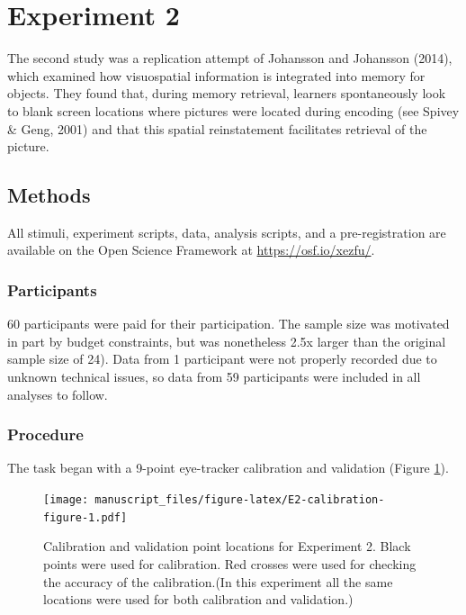 \documentclass[
  man,floatsintext]{apa6}
\begin{document}
\hypertarget{experiment-2}{%
\section{Experiment 2}\label{experiment-2}}

The second study was a replication attempt of Johansson and Johansson (2014),
which examined how visuospatial information is integrated into memory
for objects. They found that, during memory retrieval, learners
spontaneously look to blank screen locations where pictures were located
during encoding (see Spivey \& Geng, 2001) and that
this spatial reinstatement facilitates retrieval of the picture.

\hypertarget{methods-1}{%
\subsection{Methods}\label{methods-1}}

All stimuli, experiment scripts, data, analysis scripts, and a
pre-registration are available on the Open Science Framework at
\url{https://osf.io/xezfu/}.

\hypertarget{participants-2}{%
\subsubsection{Participants}\label{participants-2}}

60 participants were paid for their participation.
The sample size was motivated in part by budget constraints, but was
nonetheless 2.5x larger than the original sample size of 24).
Data from 1 participant were not properly
recorded due to unknown technical issues, so data from 59 participants
were included in all analyses to follow.

\hypertarget{procedure-1}{%
\subsubsection{Procedure}\label{procedure-1}}

The task began with a 9-point eye-tracker calibration
and validation (Figure \ref{fig:E2-calibration-figure}).

\begin{figure}
\centering
\texttt{[image: manuscript\_files/figure-latex/E2-calibration-figure-1.pdf]}
\caption{\label{fig:E2-calibration-figure}Calibration and validation point locations for Experiment 2. Black points were used for calibration. Red crosses were used for checking the accuracy of the calibration.(In this experiment all the same locations were used for both calibration and validation.)}
\end{figure}
\end{document}

